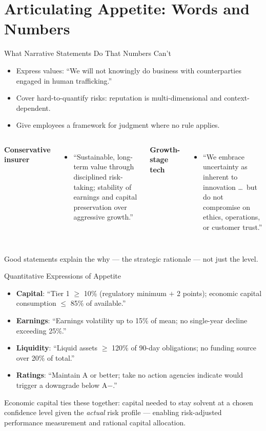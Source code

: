 \documentclass[11pt, aspectratio=169]{beamer}
\begin{document}
\section{Articulating Appetite: Words and Numbers}

\begin{frame}{What Narrative Statements Do That Numbers Can't}
\begin{itemize}
  \item Express values: ``We will not knowingly do business with counterparties engaged in human trafficking.''
  \item Cover hard-to-quantify risks: reputation is multi-dimensional and context-dependent.
  \item Give employees a framework for judgment where no rule applies.
\end{itemize}
\medskip
\begin{columns}[T]
\textbf{Conservative insurer}
\begin{itemize}
  \item ``Sustainable, long-term value through disciplined risk-taking; stability of earnings and capital preservation over aggressive growth.''
\end{itemize}
\textbf{Growth-stage tech}
\begin{itemize}
  \item ``We embrace uncertainty as inherent to innovation \ldots\ but do not compromise on ethics, operations, or customer trust.''
\end{itemize}
\end{columns}
\medskip
Good statements explain the \alert{why} --- the strategic rationale --- not just the level.
\end{frame}

\begin{frame}{Quantitative Expressions of Appetite}
\begin{itemize}
  \item \textbf{Capital}: ``Tier 1 $\geq$ 10\% (regulatory minimum $+$ 2 points); economic capital consumption $\leq$ 85\% of available.''
  \item \textbf{Earnings}: ``Earnings volatility up to 15\% of mean; no single-year decline exceeding 25\%.''
  \item \textbf{Liquidity}: ``Liquid assets $\geq$ 120\% of 90-day obligations; no funding source over 20\% of total.''
  \item \textbf{Ratings}: ``Maintain A or better; take no action agencies indicate would trigger a downgrade below A$-$.''
\end{itemize}
\medskip
\alert{Economic capital} ties these together: capital needed to stay solvent at a chosen confidence level given the \emph{actual} risk profile --- enabling risk-adjusted performance measurement and rational capital allocation.
\end{frame}
\end{document}
